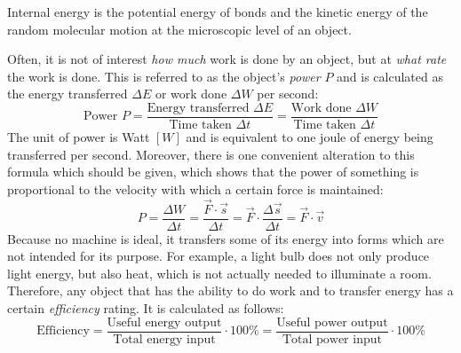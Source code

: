 
Internal energy is the potential energy of bonds and the kinetic energy of the random molecular motion at the microscopic level of an object. 


Often, it is not of interest \emph{how much} work is done by an object, but at \emph{what rate} the work is done. This is referred to as the object's \emph{power} $P$ and is calculated as the energy transferred $\Delta E$ or work done $\Delta W$ per second: $$\text{Power } P = \frac{\text{Energy transferred } \Delta E}{\text{Time taken } \Delta t} = \frac{\text{Work done } \Delta W}{\text{Time taken } \Delta t}$$ The unit of power is Watt $[W]$ and is equivalent to one joule of energy being transferred per second. Moreover, there is one convenient alteration to this formula which should be given, which shows that the power of something is proportional to the velocity with which a certain force is maintained: $$P = \frac{\Delta W}{\Delta t} = \frac{\vec{F} \cdot \vec{s}}{\Delta t} = \vec{F} \cdot \frac{\Delta \vec{s}}{\Delta t} = \vec{F} \cdot \vec{v}$$ Because no machine is ideal, it transfers some of its energy into forms which are not intended for its purpose. For example, a light bulb does not only produce light energy, but also heat, which is not actually needed to illuminate a room. Therefore, any object that has the ability to do work and to transfer energy has a certain \emph{efficiency} rating. It is calculated as follows: $$\text{Efficiency} = \frac{\text{Useful energy output}}{\text{Total energy input}} \cdot 100 \% = \frac{\text{Useful power output}}{\text{Total power input}} \cdot 100 \%$$

\pagebreak



